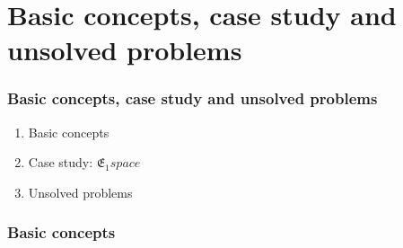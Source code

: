 \documentclass[aspectratio=169]{beamer}
\begin{document}
\section{Basic concepts, case study and unsolved problems}

\begin{frame}
    \frametitle{Basic concepts, case study and unsolved problems}
    \begin{enumerate}
        \item Basic concepts
        \item Case study: $\mathfrak{E}_1 space$
        \item Unsolved problems
    \end{enumerate}
\end{frame}

\begin{frame}
    \frametitle{Basic concepts}
    \begin{figure}[ht]\centering
    \end{figure}
\end{frame}
\end{document}
